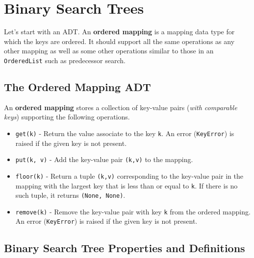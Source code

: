 \chapter{Binary Search Trees}


Let's start with an ADT.  An \textbf{ordered mapping} is a mapping data type for which the keys are ordered.
It should support all the same operations as any other mapping as well as some other operations similar to those in an \texttt{OrderedList} such as predecessor search.

\section{The Ordered Mapping ADT}


An \textbf{ordered mapping} stores a collection of key-value pairs (\emph{with comparable keys}) supporting the following operations.

\begin{itemize}

\item 

\texttt{get(k)} - Return the value associate to the key \texttt{k}.  An error (\texttt{KeyError}) is raised if the given key is not present.



\item 

\texttt{put(k, v)} - Add the key-value pair \texttt{(k,v)} to the mapping.



\item 

\texttt{floor(k)} - Return a tuple \texttt{(k,v)} corresponding to the key-value pair in the mapping with the largest key that is less than or equal to \texttt{k}.  If there is no such tuple, it returns \texttt{(None, None)}.



\item 

\texttt{remove(k)} - Remove the key-value pair with key \texttt{k} from the ordered mapping.  An error (\texttt{KeyError}) is raised if the given key is not present.



\end{itemize}
\section{Binary Search Tree Properties and Definitions}


